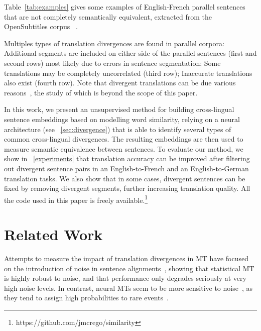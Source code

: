 \documentclass[11pt,a4paper]{article}
\begin{document}
Table~\ref{tab:examples} gives some examples of English-French parallel sentences that are not completely semantically equivalent, extracted from the OpenSubtitles corpus ~\cite{LisonTiedemann2016}. 

Multiples types of translation divergences are found in parallel corpora:
Additional segments are included on either side of the parallel sentences (first and second rows) most likely due to errors in sentence segmentation;
Some translations may be completely uncorrelated (third row);
Inaccurate translations also exist (fourth row). 
Note that divergent translations can be due various reasons~\cite{C14-1055}, the study of which is beyond the scope of this paper. 

In this work, we present an unsupervised method for building cross-lingual sentence embeddings based on modelling word similarity,  %
relying on a neural architecture (see \textsection~\ref{sec:divergence}) that is able to identify several types of common cross-lingual divergences. 
The resulting embeddings are then used to measure semantic equivalence between sentences.
To evaluate our method, we show in \textsection~\ref{experiments} that translation accuracy can be improved after filtering out divergent sentence pairs in an English-to-French and an English-to-German translation tasks.
We also show that in some cases, divergent sentences can be fixed by removing divergent segments, further increasing translation quality. All the code used in this paper is freely available.\footnote{https://github.com/jmcrego/similarity}


\section{Related Work}
\label{related}

Attempts to measure the impact of translation divergences in MT have focused on the introduction of noise in sentence alignments~\cite{goute2012}, showing that statistical MT is highly robust to noise, and that performance only degrades seriously at very high noise levels.  In contrast, neural MTs seem to be more sensitive to noise~\cite{chen2016adaptation}, as they tend to assign high probabilities to rare events~\cite{Hassan2018AchievingHP}.
\end{document}
